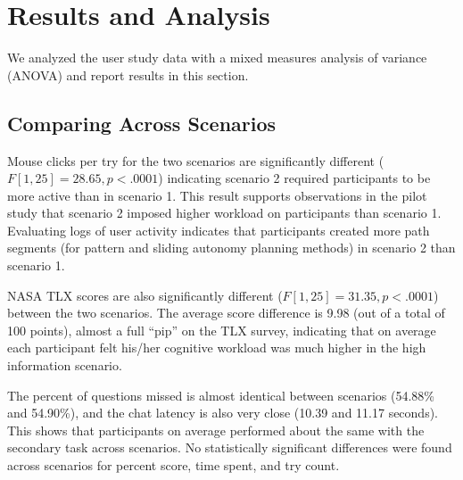 \documentclass[lettersize, apacite, twoside, HRI]{apa_HRI}
\begin{document}
\section{Results and Analysis} 
\label{sec:Results}

We analyzed the user study data with a mixed measures analysis of variance (ANOVA) and report results in this section.

\subsection{Comparing Across Scenarios}


Mouse clicks per try for the two scenarios are significantly different ($F[1,25]= 28.65, p<.0001$) indicating scenario 2 required participants to be more active than in scenario 1. This result supports observations in the pilot study that scenario 2 imposed higher workload on participants than scenario 1. Evaluating logs of user activity indicates that participants created more path segments (for pattern and sliding autonomy planning methods) in scenario 2 than scenario 1. 

NASA TLX scores are also significantly different ($F[1,25]= 31.35, p<.0001$) between the two scenarios. The average score difference is 9.98 (out of a total of 100 points), almost a full ``pip'' on the TLX survey, indicating that on average each participant felt his/her cognitive workload was much higher in the high information scenario.

The percent of questions missed is almost identical between scenarios (54.88\% and 54.90\%), and the chat latency is also very close (10.39 and 11.17 seconds). This shows that participants on average performed about the same with the secondary task across scenarios. No statistically significant differences were found across scenarios for percent score, time spent, and try count.
\end{document}

